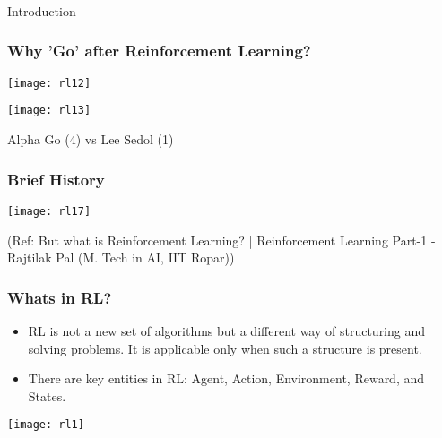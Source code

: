\begin{frame}[fragile]\frametitle{}
\begin{center}
{\Large Introduction}
\end{center}
\end{frame}


\begin{frame}[fragile]\frametitle{Why 'Go' after Reinforcement Learning?}

\begin{center}
\texttt{[image: rl12]}

\texttt{[image: rl13]}

Alpha Go (4) vs Lee Sedol (1)
\end{center}

\end{frame}

\begin{frame}[fragile]\frametitle{Brief History}

\begin{center}
\texttt{[image: rl17]}
\end{center}

{\tiny (Ref: But what is Reinforcement Learning? | Reinforcement Learning Part-1 - Rajtilak Pal (M. Tech in AI, IIT Ropar))}
\end{frame}

\begin{frame}[fragile]\frametitle{Whats in RL?}

\begin{itemize}
\item   RL is not a new set of algorithms but a different way of structuring and solving problems. It is applicable only when such a structure is present.
\item   There are key entities in RL: Agent, Action, Environment, Reward, and States.
\end{itemize}

\begin{center}
\texttt{[image: rl1]}
\end{center}

\end{frame}

